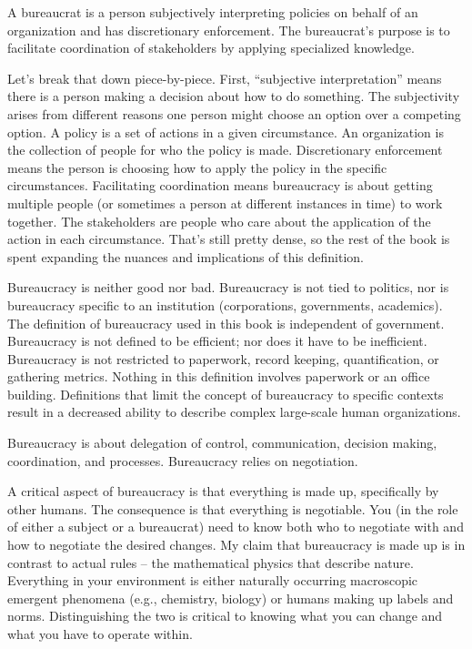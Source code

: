 A \gls{bureaucrat} is a person subjectively interpreting policies on behalf of an organization and has discretionary enforcement. The bureaucrat's purpose is to facilitate coordination of stakeholders by applying specialized knowledge. 

Let's break that down piece-by-piece. First, ``subjective interpretation'' means there is a person making a decision about how to do something. The subjectivity arises from different reasons one person might choose an option over a competing option.  A \gls{policy} is a set of actions in a given circumstance. An \gls{organization} is the collection of people for who the policy is made. Discretionary enforcement means the person is choosing how to apply the policy in the specific circumstances. Facilitating coordination means bureaucracy is about getting multiple people (or sometimes a person at different instances in time) to work together. The stakeholders are people who care about the application of the action in each circumstance.  That's still pretty dense, so the rest of the book is spent expanding the nuances and implications of this definition.

Bureaucracy is neither good nor bad. Bureaucracy is not tied to politics, nor is bureaucracy specific to an institution (corporations, governments, academics). The definition of bureaucracy used in this book is independent of government. Bureaucracy is not defined to be efficient; nor does it have to be inefficient. Bureaucracy is not restricted to paperwork, record keeping, quantification, or gathering metrics. Nothing in this definition involves paperwork or an office building. Definitions that limit the concept of bureaucracy to specific contexts result in a decreased ability to describe complex large-scale human organizations. 

Bureaucracy is about delegation of control, communication, decision making, coordination, and processes. Bureaucracy relies on negotiation. 


A critical aspect of bureaucracy is that everything is made up, specifically by other humans. The consequence is that everything is negotiable. You (in the role of either a subject or a bureaucrat) need to know both who to negotiate with and how to negotiate the desired changes. My claim that bureaucracy is made up is in contrast to actual rules -- the mathematical physics that describe nature. Everything in your environment is either naturally occurring macroscopic emergent phenomena (e.g., chemistry, biology) or humans making up labels and norms. Distinguishing the two is critical to knowing what you can change and what you have to operate within. 

